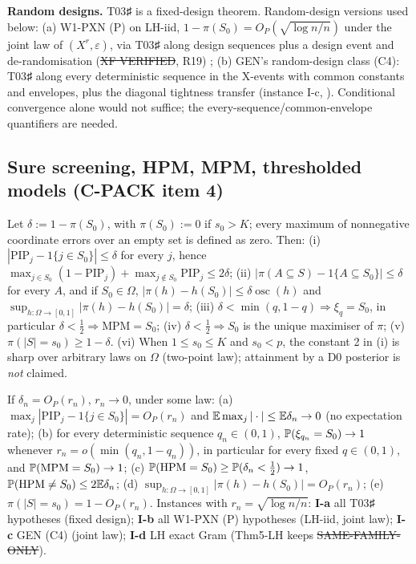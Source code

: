 \textbf{Random designs.} T03♯ is a fixed-design theorem. Random-design versions used below: (a) W1-PXN (P) on LH-iid, $1-\pi(S_0)=O_P(\sqrt{\log n/n})$ under the joint law of $(X^r,\varepsilon)$, via T03♯ along design sequences plus a design event and de-randomisation (\st{XF VERIFIED}, R19) ; (b) GEN's random-design class (C4): T03♯ along every deterministic sequence in the X-events with common constants and envelopes, plus the diagonal tightness transfer (instance I-c, ). Conditional convergence alone would not suffice; the every-sequence/common-envelope quantifiers are needed.

\subsection{Sure screening, HPM, MPM, thresholded models (C-PACK item 4)}
\begin{lemma}\label{lem:SL0}
Let $\delta:=1-\pi(S_0)$, with $\pi(S_0):=0$ if $s_0>K$; every maximum of nonnegative coordinate errors over an empty set is defined as zero. Then: (i) $|\mathrm{PIP}_j-1\{j\in S_0\}|\le\delta$ for every $j$, hence $\max_{j\in S_0}(1-\mathrm{PIP}_j)+\max_{j\notin S_0}\mathrm{PIP}_j\le2\delta$; (ii) $|\pi(A\subseteq S)-1\{A\subseteq S_0\}|\le\delta$ for every $A$, and if $S_0\in\Omega$, $|\pi(h)-h(S_0)|\le\delta\operatorname{osc}(h)$ and $\sup_{h:\Omega\to[0,1]}|\pi(h)-h(S_0)|=\delta$; (iii) $\delta<\min(q,1-q)\Rightarrow\xi_q=S_0$, in particular $\delta<\frac12\Rightarrow\mathrm{MPM}=S_0$; (iv) $\delta<\frac12\Rightarrow S_0$ is the unique maximiser of $\pi$; (v) $\pi(|S|=s_0)\ge1-\delta$. (vi) When $1\le s_0\le K$ and $s_0<p$, the constant 2 in (i) is sharp over arbitrary laws on $\Omega$ (two-point law); attainment by a D0 posterior is \emph{not} claimed.
\end{lemma}
\begin{corollary}[SL1]\label{cor:SL1}
If $\delta_n=O_P(r_n)$, $r_n\to0$, under some law: (a) $\max_j|\mathrm{PIP}_j-1\{j\in S_0\}|=O_P(r_n)$ and $\mathbb E\max_j|\cdot|\le\mathbb E\delta_n\to0$ (no expectation rate); (b) for every deterministic sequence $q_n\in(0,1)$, $\mathbb P(\xi_{q_n}=S_0)\to1$ whenever $r_n=o(\min(q_n,1-q_n))$, in particular for every fixed $q\in(0,1)$, and $\mathbb P(\mathrm{MPM}=S_0)\to1$; (c) $\mathbb P(\mathrm{HPM}=S_0)\ge\mathbb P(\delta_n<\frac12)\to1$, $\mathbb P(\mathrm{HPM}\ne S_0)\le2\mathbb E\delta_n$; (d) $\sup_{h:\Omega\to[0,1]}|\pi(h)-h(S_0)|=O_P(r_n)$; (e) $\pi(|S|=s_0)=1-O_P(r_n)$. Instances with $r_n=\sqrt{\log n/n}$: \textbf{I-a} all T03♯ hypotheses (fixed design); \textbf{I-b} all W1-PXN (P) hypotheses (LH-iid, joint law); \textbf{I-c} GEN (C4) (joint law); \textbf{I-d} LH exact Gram (Thm5-LH keeps \st{SAME-FAMILY-ONLY}).
\end{corollary}
